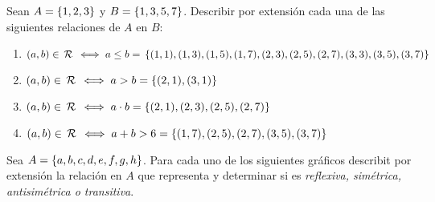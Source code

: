 \ejercicio Sean $A = \left\{ 1, 2, 3 \right\}$ y $B = \left\{ 1, 3, 5, 7 \right\}$. Describir por extensión cada una de las
siguientes relaciones de $A$ en $B$:
\begin{enumerate}[label=\roman*)]
	\item $(a,b) \in \,\mathcal{R}\, \iff a\leq b =\\
		      \left\{ (1,1), (1,3), (1,5), (1,7), (2,3), (2,5), (2,7), (3,3), (3,5), (3,7) \right\}$

	\item $(a,b) \in \,\mathcal{R}\, \iff a > b = \left\{ (2,1), (3, 1) \right\}$

	\item $(a,b) \in \,\mathcal{R}\, \iff a \cdot b = \left\{ (2,1), (2,3), (2,5), (2,7) \right\}$

	\item $(a,b) \in \,\mathcal{R}\, \iff a + b > 6 = \left\{ (1,7), (2,5), (2, 7), (3, 5), (3, 7) \right\}$
\end{enumerate}
\ejercicio Sea $A = \left\{ a,b,c,d,e,f,g,h \right\}$. Para cada uno de los siguientes gráficos describit por
extensión la relación en $A$ que representa y determinar si es \textit{reflexiva, simétrica, antisimétrica o transitiva}.
